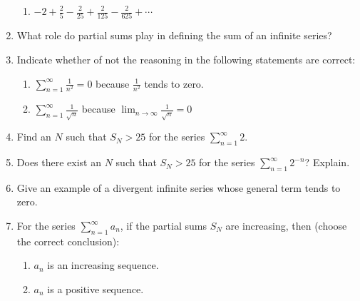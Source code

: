 \documentclass{nosvagor-notes}
\begin{document}
\begin{enumerate}
\begin{enumerate}
      \item \(-2 + \frac{2}{5} - \frac{2}{25} + \frac{2}{125} - \frac{2}{625} + \cdots \)
    \end{enumerate}
  \newpage

  \item What role do partial sums play in defining the sum of an infinite
    series?
    \vspace{90pt}

  \item Indicate whether of not the reasoning in the following statements are
    correct:
    \begin{enumerate}
      \item \(\displaystyle \sum_{n=1}^{\infty} \frac{1}{n^2} = 0\) because
        \(\frac{1}{n^2}\) tends to zero.
      \vspace{110pt}

      \item \(\displaystyle \sum_{n=1}^{\infty} \frac{1}{\sqrt{n}}\) because
        \(\displaystyle \lim_{n \to \infty}\frac{1}{\sqrt{n} } = 0\)
      \vspace{110pt}
    \end{enumerate}

  \item Find an \(N\) such that \(S_N > 25\) for the series \(\displaystyle
    \sum_{n=1}^{\infty} 2\).
    \vspace{110pt}

  \item Does there exist an \(N\) such that \(S_N > 25\) for the series
    \(\sum_{n=1}^{\infty} 2^{-n}\)? Explain.
    \vspace{90pt}

  \newpage

  \item Give an example of a divergent infinite series whose general term tends
    to zero.
    \vspace{90pt}

  \item For the series \(\displaystyle \sum_{n=1}^{\infty} a_n\), if the
    partial sums \(S_N\) are increasing, then (choose the correct conclusion):
    \begin{enumerate}
      \item \({a_n}\) is an increasing sequence.
      \item \({a_n}\) is a positive sequence.
    \end{enumerate}
  \vspace{60pt}


\end{enumerate}
\end{document}
